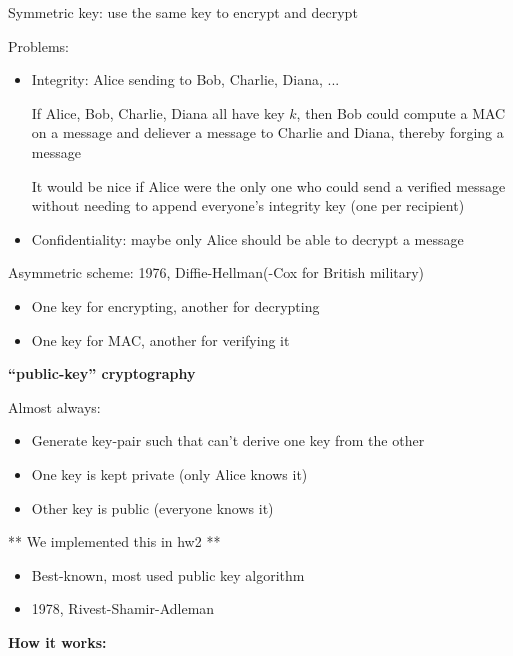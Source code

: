 Symmetric key: use the same key to encrypt and decrypt

Problems:
\begin{itemize}
    \item Integrity: Alice sending to Bob, Charlie, Diana, ...

        If Alice, Bob, Charlie, Diana all have key $k$, then Bob could compute
        a MAC on a message and deliever a message to Charlie and Diana, thereby
        forging a message

        It would be nice if Alice were the only one who could send a verified
        message without needing to append everyone's integrity key (one per
        recipient)
    \item Confidentiality: maybe only Alice should be able to decrypt a message
\end{itemize}

Asymmetric scheme: 1976, Diffie-Hellman(-Cox for British military)
\begin{itemize}
\item One key for encrypting, another for decrypting
\item One key for MAC, another for verifying it
\end{itemize}

\begin{definition}
{\bf ``public-key'' cryptography}

    Almost always:
    \begin{itemize}
        \item Generate key-pair such that can't derive one key from the other
        \item One key is kept private (only Alice knows it)
        \item Other key is public (everyone knows it)
    \end{itemize}
\end{definition}

** We implemented this in hw2 **
\begin{itemize}
    \item Best-known, most used public key algorithm
    \item 1978, Rivest-Shamir-Adleman
\end{itemize}

{\bf How it works:}

